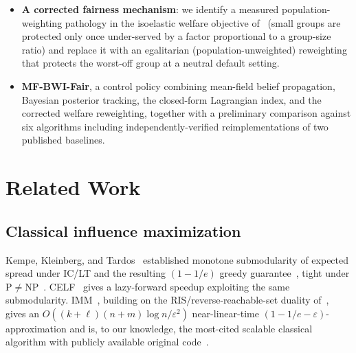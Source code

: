 \documentclass[journal]{IEEEtran}
\begin{document}
\begin{itemize}
  remains an open conjecture, not a claimed result of this paper
  (Section~\ref{sec:limitations}).
\item \textbf{A corrected fairness mechanism}: we identify a measured
  population-weighting pathology in the isoelastic welfare objective
  of~\cite{rahmattalabi2021fair} (small groups are protected only once
  under-served by a factor proportional to a group-size ratio) and replace
  it with an egalitarian (population-unweighted) reweighting that protects
  the worst-off group at a neutral default setting.
\item \textbf{MF-BWI-Fair}, a control policy combining mean-field belief
  propagation, Bayesian posterior tracking, the closed-form Lagrangian
  index, and the corrected welfare reweighting, together with a preliminary
  comparison against six algorithms including independently-verified
  reimplementations of two published baselines.
\end{itemize}

\section{Related Work}
\label{sec:related}

\subsection{Classical influence maximization}
Kempe, Kleinberg, and Tardos~\cite{kempe2003maximizing} established
monotone submodularity of expected spread under IC/LT and the resulting
$(1-1/e)$ greedy guarantee~\cite{nemhauser1978analysis}, tight under
$\mathrm{P}\ne\mathrm{NP}$~\cite{feige1998threshold}. CELF~\cite{leskovec2007cost}
gives a lazy-forward speedup exploiting the same submodularity. IMM~\cite{tang2015influence},
building on the RIS/reverse-reachable-set duality of~\cite{borgs2014maximizing},
gives an $O((k+\ell)(n+m)\log n/\varepsilon^2)$ near-linear-time
$(1-1/e-\varepsilon)$-approximation and is, to our knowledge, the most-cited
scalable classical algorithm with publicly available original
code~\cite{chen2018issue}.
\end{document}
